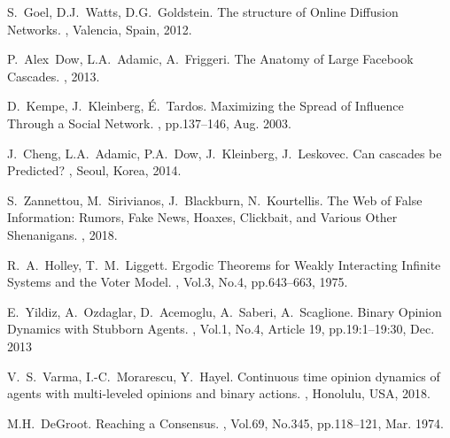 \documentclass[10pt, conference, letterpaper]{IEEEtran}
\begin{document}
{%

%
\begin{thebibliography}{10}

S.~Goel, D.J.~Watts, D.G.~Goldstein.
\newblock The structure of Online Diffusion Networks.
, Valencia, Spain, 2012.

P.~Alex~Dow, L.A.~Adamic, A.~Friggeri.
\newblock The Anatomy of Large Facebook Cascades.
, 2013.

D.~Kempe, J.~Kleinberg, \'{E}.~Tardos.
\newblock Maximizing the Spread of Influence Through a Social Network.
, pp.137--146, Aug. 2003.

J.~Cheng, L.A.~Adamic, P.A.~Dow, J.~Kleinberg, J.~Leskovec.
\newblock Can cascades be Predicted?
, Seoul, Korea, 2014.

S.~Zannettou, M.~Sirivianos, J.~Blackburn, N.~Kourtellis.
\newblock The Web of False Information: Rumors, Fake News, Hoaxes, Clickbait, and Various Other Shenanigans.
, 2018.

R.~A.~Holley, T.~M.~Liggett.
\newblock Ergodic Theorems for Weakly Interacting Infinite Systems and the Voter Model.
, Vol.3, No.4, pp.643--663, 1975.

E.~Yildiz, A.~Ozdaglar, D.~Acemoglu, A.~Saberi, A.~Scaglione.
\newblock Binary Opinion Dynamics with Stubborn Agents.
, Vol.1, No.4, Article 19, pp.19:1--19:30, Dec. 2013


V.~S.~Varma, I.-C.~Morarescu, Y.~Hayel.
\newblock Continuous time opinion dynamics of agents with multi-leveled opinions and binary actions.
, Honolulu, USA, 2018.

M.H.~DeGroot.
\newblock Reaching a Consensus.
, Vol.69, No.345, pp.118--121, Mar. 1974.


\end{thebibliography}}
\end{document}
